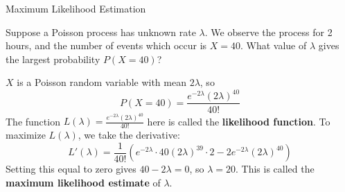 \documentclass[handout]{beamer}
\renewcommand{\emph}{\textbf}
\begin{document}
%
%
%

\begin{frame}{Maximum Likelihood Estimation}
\begin{block}{}
Suppose a Poisson process has unknown rate $\lambda$. We observe the process for 2 hours, and the number of events which occur is $X=40$. What value of $\lambda$ gives the largest probability $P(X=40)$?
\end{block}
\pause $X$ is a Poisson random variable with mean $2\lambda$, so
$$P(X=40) = \frac{e^{-2\lambda}(2\lambda)^{40}}{40!}$$
\pause The function $L(\lambda)=\frac{e^{-2\lambda}(2\lambda)^{40}}{40!}$ here is called the \emph{likelihood function}. \pause To maximize $L(\lambda)$, we take the derivative:
$$L'(\lambda) = 
\frac1{40!}(e^{-2\lambda}\cdot40(2\lambda)^{39}\cdot2-2e^{-2\lambda}(2\lambda)^{40})$$
\pause Setting this equal to zero gives $40-2\lambda=0$, so $\lambda=20$. This is called the \emph{maximum likelihood estimate} of $\lambda$.
\end{frame}
\end{document}
